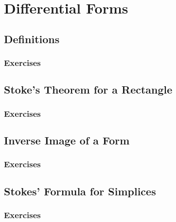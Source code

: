 \setcounter{chapter}{0}
\renewcommand{\thechapter}{21}
\chapter{Differential Forms}\label{ch:21}
\setcounter{equation}{0}	        %

\section{Definitions}\label{sec:21.1}
\subsection*{Exercises}\label{sec:21.1_Exercises}
\section{Stoke's Theorem for a Rectangle}\label{sec:21.2}	
\subsection*{Exercises}\label{sec:21.2_Exercises}
\section{Inverse Image of a Form}\label{sec:21.3}	
\subsection*{Exercises}\label{sec:21.3_Exercises}
\section{Stokes' Formula for Simplices}\label{sec:21.4}	
\subsection*{Exercises}\label{sec:21.4_Exercises}
